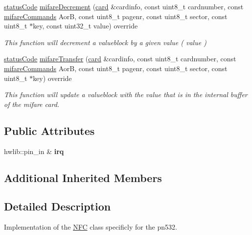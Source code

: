 \begin{DoxyCompactItemize}
\hyperlink{declarations_8h_ae1d20c5a38cae82ccaa6a77be3fd264b}{status\+Code} \hyperlink{classnfc_1_1PN532__chip_a564426d78d1041dcfcf450c5086b3656}{mifare\+Decrement} (\hyperlink{classcard}{card} \&cardinfo, const uint8\+\_\+t cardnumber, const \hyperlink{declarations_8h_a305b1a3bcfca65e2a82f0f9d24676835}{mifare\+Commands} AorB, const uint8\+\_\+t pagenr, const uint8\+\_\+t sector, const uint8\+\_\+t $\ast$key, const uint32\+\_\+t value) override
\begin{DoxyCompactList}\small\item\em This function will decrement a valueblock by a given value ( value ) \end{DoxyCompactList}\item 
\hyperlink{declarations_8h_ae1d20c5a38cae82ccaa6a77be3fd264b}{status\+Code} \hyperlink{classnfc_1_1PN532__chip_a7c0e1c1e6df0dbe1d53f27b27f26ff8f}{mifare\+Transfer} (\hyperlink{classcard}{card} \&cardinfo, const uint8\+\_\+t cardnumber, const \hyperlink{declarations_8h_a305b1a3bcfca65e2a82f0f9d24676835}{mifare\+Commands} AorB, const uint8\+\_\+t pagenr, const uint8\+\_\+t sector, const uint8\+\_\+t $\ast$key) override
\begin{DoxyCompactList}\small\item\em This function will update a valueblock with the value that is in the internal buffer of the mifare card. \end{DoxyCompactList}\end{DoxyCompactItemize}
\subsection*{Public Attributes}
\begin{DoxyCompactItemize}
\item 
\mbox{\label{classnfc_1_1PN532__chip_a8cebf8046f1adcc2730d34d128020174}} 
hwlib\+::pin\+\_\+in \& {\bfseries irq}
\end{DoxyCompactItemize}
\subsection*{Additional Inherited Members}


\subsection{Detailed Description}
Implementation of the \hyperlink{classnfc_1_1NFC}{N\+FC} class specificly for the pn532. 


